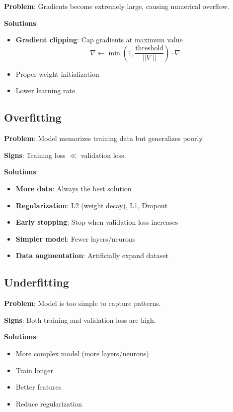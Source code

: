 \textbf{Problem}: Gradients become extremely large, causing numerical overflow.

\textbf{Solutions}:
\begin{itemize}
    \item \textbf{Gradient clipping}: Cap gradients at maximum value
    \[
    \nabla \leftarrow \min\left(1, \frac{\text{threshold}}{||\nabla||}\right) \cdot \nabla
    \]
    \item Proper weight initialization
    \item Lower learning rate
\end{itemize}

\subsection{Overfitting}

\textbf{Problem}: Model memorizes training data but generalizes poorly.

\textbf{Signs}: Training loss $\ll$ validation loss.

\textbf{Solutions}:
\begin{itemize}
    \item \textbf{More data}: Always the best solution
    \item \textbf{Regularization}: L2 (weight decay), L1, Dropout
    \item \textbf{Early stopping}: Stop when validation loss increases
    \item \textbf{Simpler model}: Fewer layers/neurons
    \item \textbf{Data augmentation}: Artificially expand dataset
\end{itemize}

\subsection{Underfitting}

\textbf{Problem}: Model is too simple to capture patterns.

\textbf{Signs}: Both training and validation loss are high.

\textbf{Solutions}:
\begin{itemize}
    \item More complex model (more layers/neurons)
    \item Train longer
    \item Better features
    \item Reduce regularization
\end{itemize}

